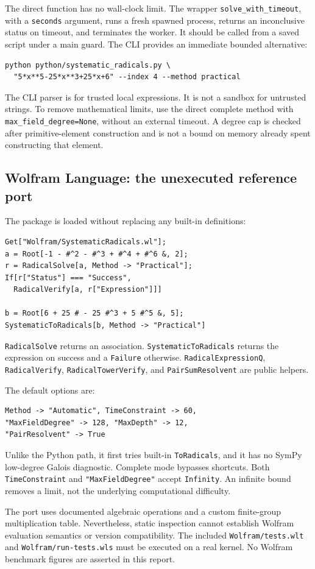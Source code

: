 \documentclass[11pt,letterpaper]{article}
\theoremstyle{definition}\newtheorem{definition}[theorem]{Definition}
\theoremstyle{remark}\newtheorem{remark}[theorem]{Remark}
\newcommand{\code}[1]{\texttt{#1}}
\begin{document}
The direct function has no wall-clock limit. The wrapper
\code{solve\_with\_timeout}, with a \code{seconds} argument, runs a fresh spawned process,
returns an inconclusive status on timeout, and terminates the worker. It
should be called from a saved script under a main guard. The CLI provides
an immediate bounded alternative:
\begin{lstlisting}
python python/systematic_radicals.py \
  "5*x**5-25*x**3+25*x+6" --index 4 --method practical
\end{lstlisting}
The CLI parser is for trusted local expressions. It is not a sandbox for
untrusted strings. To remove mathematical limits, use the direct complete
method with \code{max\_field\_degree=None}, without an external timeout.
A degree cap is checked after primitive-element construction and is not a
bound on memory already spent constructing that element.

\subsection{Wolfram Language: the unexecuted reference port}
The package is loaded without replacing any built-in definitions:
\begin{lstlisting}
Get["Wolfram/SystematicRadicals.wl"];
a = Root[-1 - #^2 - #^3 + #^4 + #^6 &, 2];
r = RadicalSolve[a, Method -> "Practical"];
If[r["Status"] === "Success",
  RadicalVerify[a, r["Expression"]]]

b = Root[6 + 25 # - 25 #^3 + 5 #^5 &, 5];
SystematicToRadicals[b, Method -> "Practical"]
\end{lstlisting}
\code{RadicalSolve} returns an association. \code{SystematicToRadicals}
returns the expression on success and a \code{Failure} otherwise.
\code{RadicalExpressionQ}, \code{RadicalVerify},
\code{RadicalTowerVerify}, and \code{PairSumResolvent} are public helpers.

The default options are:
\begin{lstlisting}
Method -> "Automatic", TimeConstraint -> 60,
"MaxFieldDegree" -> 128, "MaxDepth" -> 12,
"PairResolvent" -> True
\end{lstlisting}
Unlike the Python path, it first tries built-in \code{ToRadicals}, and it
has no SymPy low-degree Galois diagnostic. Complete mode bypasses shortcuts.
Both \code{TimeConstraint} and \code{"MaxFieldDegree"} accept
\code{Infinity}. An infinite bound removes a limit, not the underlying
computational difficulty.

The port uses documented algebraic operations and a custom finite-group
multiplication table. Nevertheless, static inspection cannot establish
Wolfram evaluation semantics or version compatibility. The included
\code{Wolfram/tests.wlt} and \code{Wolfram/run-tests.wls} must be executed
on a real kernel. No Wolfram benchmark figures are asserted in this report.
\end{document}
